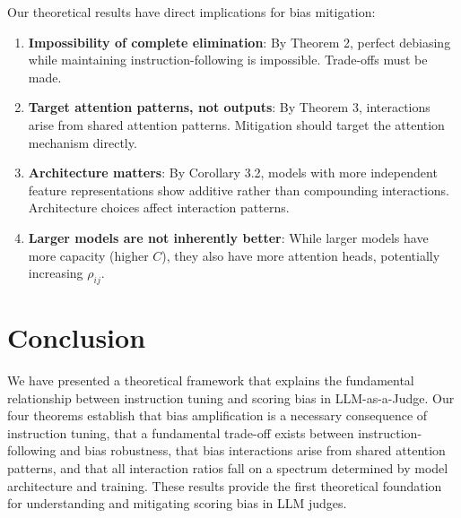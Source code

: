 \documentclass[11pt]{article}
\begin{document}
Our theoretical results have direct implications for bias mitigation:

\begin{enumerate}
    \item \textbf{Impossibility of complete elimination}: By Theorem 2, perfect debiasing while maintaining instruction-following is impossible. Trade-offs must be made.
    \item \textbf{Target attention patterns, not outputs}: By Theorem 3, interactions arise from shared attention patterns. Mitigation should target the attention mechanism directly.
    \item \textbf{Architecture matters}: By Corollary 3.2, models with more independent feature representations show additive rather than compounding interactions. Architecture choices affect interaction patterns.
    \item \textbf{Larger models are not inherently better}: While larger models have more capacity (higher $C$), they also have more attention heads, potentially increasing $\rho_{ij}$.
\end{enumerate}

\section{Conclusion}

We have presented a theoretical framework that explains the fundamental relationship between instruction tuning and scoring bias in LLM-as-a-Judge. Our four theorems establish that bias amplification is a necessary consequence of instruction tuning, that a fundamental trade-off exists between instruction-following and bias robustness, that bias interactions arise from shared attention patterns, and that all interaction ratios fall on a spectrum determined by model architecture and training. These results provide the first theoretical foundation for understanding and mitigating scoring bias in LLM judges.
\end{document}

